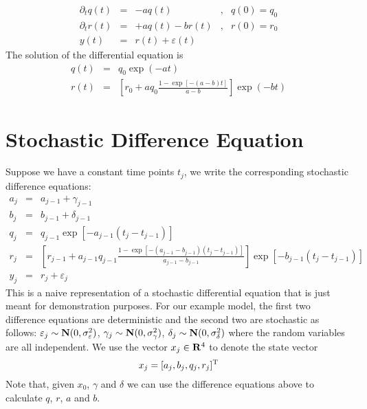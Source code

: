 \documentclass{article}
\newcommand{\BN}{{\bf N}}
\newcommand{\BR}{{\bf R}}
\newcommand{\RT}{{\rm T}}
\begin{document}
\[
\begin{array}{rcllcl}
\partial_t q(t) & = & - a q(t)                     & , & q(0) = q_0  
\\
\partial_t r(t) & = & + a q(t) - b r(t)            & , & r(0) = r_0
\\
y(t)                      & = & r(t) + \varepsilon (t)
\end{array}
\]
The solution of the differential equation is
\begin{eqnarray*}
q(t) & = & q_0 \exp ( - a t )
\\
r(t) & = & \left[ 
	r_0 + a q_0 \frac{ 1  - \exp[ - (a - b) t ] }{ a - b } 
\right] \exp( - b t )
\end{eqnarray*}


\section{Stochastic Difference Equation}
Suppose we have a constant time points \( t_j \),
we write the corresponding stochastic difference equations:
\begin{eqnarray*}
a_j & = & a_{j-1} + \gamma_{j-1}
\\
b_j & = & b_{j-1} + \delta_{j-1}
\\
q_j & = & q_{j-1} \exp [ - a_{j-1} ( t_j - t_{j-1} ) ] 
\\ 
r_j & = & 
\left [ r_{j-1} + a_{j-1} q_{j-1} 
	\frac{ 1 - \exp[ - (a_{j-1} - b_{j-1}) ( t_j - t_{j-1} ) ] }
		{ a_{j-1} - b_{j-1} }
\right] \exp[ - b_{j-1} ( t_j - t_{j-1} ) ]
\\
y_j     & = & r_j + \varepsilon_j
\end{eqnarray*}
This is a naive representation of a stochastic differential equation that
is just meant for demonstration purposes.
For our example model,
the first two difference equations are deterministic
and the second two are stochastic as follows:
\( \varepsilon_j \sim \BN(0, \sigma_\varepsilon^2 ) \),
\( \gamma_j \sim \BN(0, \sigma_\gamma^2 ) \),
\( \delta_j \sim \BN(0, \sigma_\delta^2 ) \)
where the random variables are all independent.
We use the vector \( x_j \in \BR^4 \) to denote the state vector
\[
x_j = [ a_j , b_j, q_j , r_j ]^\RT
\]
Note that, given \( x_0 \), \( \gamma \) and \( \delta \)
we can use the difference equations above to calculate 
\(  q \), \( r \), \( a \) and \( b \).
\end{document}

